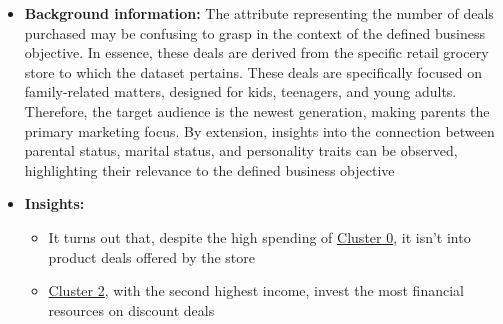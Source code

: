 \documentclass[11pt]{article}
\begin{document}
\begin{itemize}
	\item \textbf{Background information:} The attribute representing the number of deals purchased may be confusing to grasp in the context of the defined business objective. In essence, these deals are derived from the specific retail grocery store to which the dataset pertains. These deals are specifically focused on family-related matters, designed for kids, teenagers, and young adults. Therefore, the target audience is the newest generation, making parents the primary marketing focus. By extension, insights into the connection between parental status, marital status, and personality traits can be observed, highlighting their relevance to the defined business objective

\end{itemize}
\vspace{1\baselineskip}
\begin{itemize}
	\item \textbf{Insights:}

\begin{itemize}
	\item It turns out that, despite the high spending of \uline{\textcolor[HTML]{BF9000}{Cluster 0}}, it isn't into product deals offered by the store

	\item \uline{\textcolor[HTML]{38761D}{Cluster 2}}, with the second highest income, invest the most financial resources on discount deals

\end{itemize}
\end{itemize}
\vspace{1\baselineskip}
\end{document}
